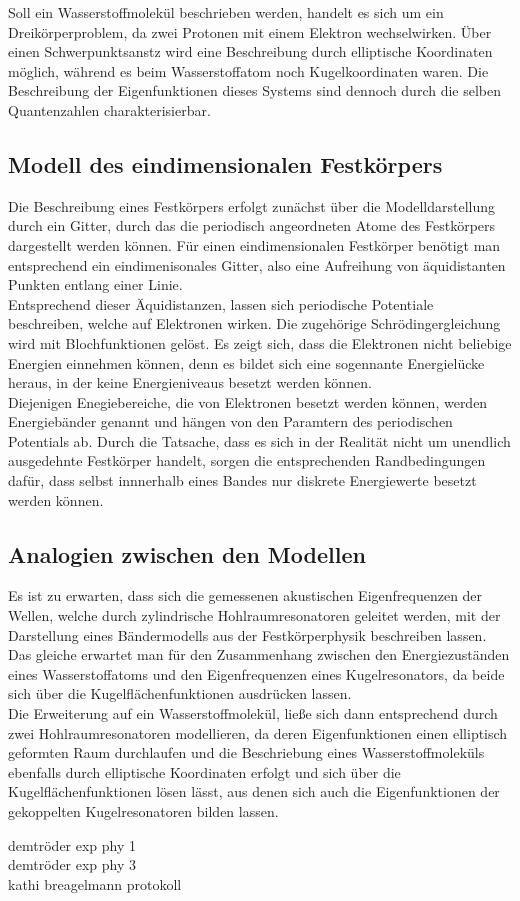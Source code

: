 Soll ein Wasserstoffmolekül beschrieben werden, handelt es sich um ein Dreikörperproblem,
da zwei Protonen mit einem Elektron wechselwirken. Über einen Schwerpunktsanstz wird
eine Beschreibung durch elliptische Koordinaten möglich, während es beim Wasserstoffatom noch 
Kugelkoordinaten waren. Die Beschreibung der Eigenfunktionen dieses Systems sind dennoch durch 
die selben Quantenzahlen charakterisierbar.

\subsection{Modell des eindimensionalen Festkörpers}
Die Beschreibung eines Festkörpers erfolgt zunächst über die Modelldarstellung durch ein 
Gitter, durch das die periodisch angeordneten Atome des Festkörpers dargestellt werden können.
Für einen eindimensionalen Festkörper benötigt man entsprechend ein eindimenisonales Gitter,
also eine Aufreihung von äquidistanten Punkten entlang einer Linie.\\

Entsprechend dieser Äquidistanzen, lassen sich periodische Potentiale beschreiben, 
welche auf Elektronen wirken. Die zugehörige Schrödingergleichung wird mit 
Blochfunktionen gelöst. Es zeigt sich, dass die Elektronen nicht beliebige Energien 
einnehmen können, denn es bildet sich eine sogennante Energielücke heraus, in der 
keine Energieniveaus besetzt werden können.\\

Diejenigen Enegiebereiche, die von Elektronen besetzt werden können, werden Energiebänder 
genannt und hängen von den Paramtern des periodischen Potentials ab. Durch die 
Tatsache, dass es sich in der Realität nicht um unendlich ausgedehnte Festkörper handelt, 
sorgen die entsprechenden Randbedingungen dafür, dass selbst innnerhalb eines Bandes 
nur diskrete Energiewerte besetzt werden können.\\

\subsection{Analogien zwischen den Modellen}
Es ist zu erwarten, dass sich die gemessenen akustischen Eigenfrequenzen der Wellen,
welche durch zylindrische Hohlraumresonatoren geleitet werden, mit der Darstellung eines
Bändermodells aus der Festkörperphysik beschreiben lassen.\\
Das gleiche erwartet man für den Zusammenhang zwischen den Energiezuständen eines 
Wasserstoffatoms und den Eigenfrequenzen eines Kugelresonators, da beide sich über die 
Kugelflächenfunktionen ausdrücken lassen.\\
Die Erweiterung auf ein Wasserstoffmolekül, ließe sich dann entsprechend durch 
zwei Hohlraumresonatoren modellieren, da deren Eigenfunktionen einen elliptisch 
geformten Raum durchlaufen und die Beschriebung eines Wasserstoffmoleküls ebenfalls 
durch elliptische Koordinaten erfolgt und sich über die Kugelflächenfunktionen
lösen lässt, aus denen sich auch die Eigenfunktionen der gekoppelten Kugelresonatoren 
bilden lassen. 

\cite{sample}
demtröder exp phy 1\\
demtröder exp phy 3\\
kathi breagelmann protokoll\\
